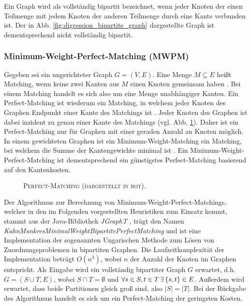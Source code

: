 Ein Graph wird als vollständig bipartit bezeichnet, wenn jeder Knoten der einen Teilmenge mit jedem Knoten
der anderen Teilmenge durch eine Kante verbunden ist. Der in Abb. \ref{fig:digression_bipartite_graph}
dargestellte Graph ist dementsprechend nicht vollständig bipartit.

\subsubsection{Minimum-Weight-Perfect-Matching (\textsc{MWPM})}
\label{sec:digression_mwpm}

Gegeben sei ein ungerichteter Graph $G = (V, E)$. Eine Menge $M \subseteq E$ heißt Matching,
wenn keine zwei Kanten aus $M$ einen Knoten gemeinsam haben \cite{Gibbons1985}. Bei einem Matching handelt es sich also
um eine Menge unabhängiger Kanten. Ein Perfect-Matching ist wiederum ein Matching, in welchem jeder Knoten des Graphen
Endpunkt einer Kante des Matchings ist \cite{Gibbons1985}. Jeder Knoten des Graphen ist dabei inzident zu genau einer Kante
des Matchings (vgl. Abb. \ref{fig:perfect_matching}).
Daher ist ein Perfect-Matching nur für Graphen mit einer geraden Anzahl an Knoten möglich.
In einem gewichteten Graphen ist ein Minimum-Weight-Matching ein Matching, bei welchem die Summe der Kantengewichte
minimal ist \cite{Gibbons1985}. Ein Minimum-Weight-Perfect-Matching ist dementsprechend ein günstigstes Perfect-Matching
basierend auf den Kantenkosten.

\begin{figure}[H]
\centering
{}
\caption{\textsc{Perfect-Matching (dargestellt in rot).}}
\label{fig:perfect_matching}
\end{figure}

Der Algorithmus zur Berechnung von Minimum-Weight-Perfect-Matchings, welcher in den im Folgenden
vorgestellten Heuristiken zum Einsatz kommt, stammt aus der Java-Bibliothek \textit{JGraphT} \cite{JGraphT}, trägt
den Namen \textit{KuhnMunkresMinimalWeightBipartitePerfectMatching} und ist eine Implementation der
sogenannten Ungarischen Methode zum Lösen von Zuordnungsproblemen in bipartiten Graphen.
Die Laufzeitkomplexität der Implementation beträgt $O(n^3)$, wobei $n$ der Anzahl der Knoten im Graphen entspricht.
Als Eingabe wird ein vollständig bipartiter Graph $G$ erwartet, d.h. $G= (S \cup T, E)$, wobei $S \cap T = \emptyset$ und
$\forall s \in S, t \in T \thinspace \exists \thinspace \{s, t\} \in E$. Außerdem wird erwartet, dass beide Partitionen gleich groß sind,
also $|S| = |T|$. Bei der Rückgabe des Algorithmus handelt es sich um ein Perfect-Matching der geringsten Kosten.

